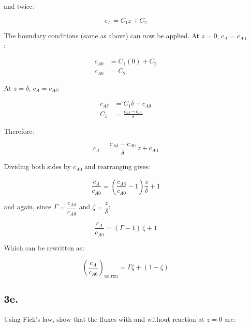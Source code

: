\documentclass[letterpaper,12pt]{article}
\begin{document}
and twice:

\begin{equation}
    c_A = C_1 z + C_2
\end{equation}

The boundary conditions (same as above) can now be applied. At $z = 0$, $c_A = c_{A0}$:

\begin{equation}
\begin{aligned}
    c_{A0} &= C_1(0) + C_2 \\
    c_{A0} &= C_2
\end{aligned}
\end{equation}

At $z = \delta$, $c_A = c_{A \delta}$:

\begin{equation}
\begin{aligned}
    c_{A\delta} &= C_1\delta + c_{A0} \\
    C_1         &= \frac{c_{A\delta} - c_{A0}}{\delta}
\end{aligned}
\end{equation}

Therefore:

\begin{equation}
    c_A = \frac{c_{A\delta} - c_{A0}}{\delta}\, z + c_{A0}
\end{equation}

Dividing both sides by $c_{A0}$ and rearranging gives:

\begin{equation}
    \frac{c_A}{c_{A0}} = \left(\frac{c_{A\delta}}{c_{A0}} - 1\right)\frac{z}{\delta} + 1
\end{equation}

and again, since $\Gamma = \dfrac{c_{A \delta}}{c_{A0}}$ and $\zeta = \dfrac{z}{\delta}$:

\begin{equation}
    \frac{c_A}{c_{A0}} = (\Gamma - 1)\,\zeta + 1
\end{equation}

Which can be rewritten as:

\begin{equation}
\boxed{
    \left(\frac{c_A}{c_{A0}}\right)_{\text{no rxn}} = \Gamma\zeta + (1 - \zeta)
}
\end{equation}


\subsection*{3e.}
Using Fick's law, show that the fluxes with and without reaction at $z = 0$ are:
\end{document}
